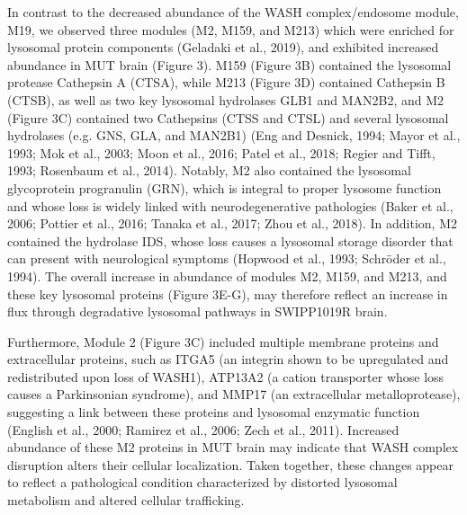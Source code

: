 In contrast to the decreased abundance of the WASH complex/endosome module, M19,
we observed three modules (M2, M159, and M213) which were enriched for lysosomal
protein components (Geladaki et al., 2019), and exhibited increased abundance in
MUT brain (Figure 3). M159 (Figure 3B) contained the lysosomal protease
Cathepsin A (CTSA), while M213 (Figure 3D) contained Cathepsin B (CTSB), as well
as two key lysosomal hydrolases GLB1 and MAN2B2, and M2 (Figure 3C) contained
two Cathepsins (CTSS and CTSL) and several lysosomal hydrolases (e.g. GNS, GLA,
and MAN2B1) (Eng and Desnick, 1994; Mayor et al., 1993; Mok et al., 2003; Moon
et al., 2016; Patel et al., 2018; Regier and Tifft, 1993; Rosenbaum et al.,
2014). Notably, M2 also contained the lysosomal glycoprotein progranulin (GRN),
which is integral to proper lysosome function and whose loss is widely linked
with neurodegenerative pathologies (Baker et al., 2006; Pottier et al., 2016;
Tanaka et al., 2017; Zhou et al., 2018). In addition, M2 contained the hydrolase
IDS, whose loss causes a lysosomal storage disorder that can present with
neurological symptoms (Hopwood et al., 1993; Schröder et al., 1994). The overall
increase in abundance of modules M2, M159, and M213, and these key lysosomal
proteins (Figure 3E-G), may therefore reflect an increase in flux through
degradative lysosomal pathways in SWIPP1019R brain. 

Furthermore, Module 2 (Figure 3C) included multiple membrane proteins and
extracellular proteins, such as ITGA5 (an integrin shown to be upregulated and
redistributed upon loss of WASH1), ATP13A2 (a cation transporter whose loss
causes a Parkinsonian syndrome), and MMP17 (an extracellular metalloprotease),
suggesting a link between these proteins and lysosomal enzymatic function
(English et al., 2000; Ramirez et al., 2006; Zech et al., 2011). Increased
abundance of these M2 proteins in MUT brain may indicate that WASH complex
disruption alters their cellular localization. Taken together, these changes
appear to reflect a pathological condition characterized by distorted lysosomal
metabolism and altered cellular trafficking.

